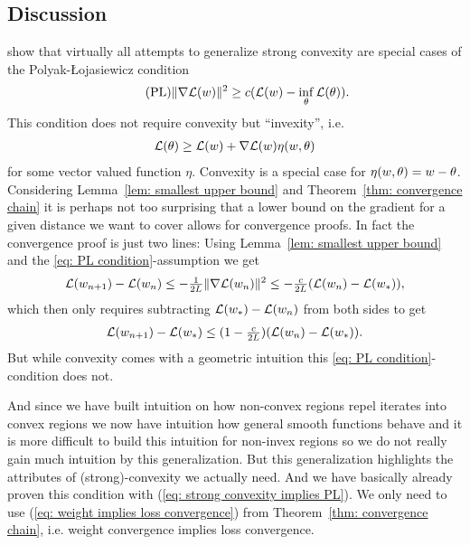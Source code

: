 \subsection{Discussion}

\textcite{karimiLinearConvergenceGradient2020} show that virtually all
attempts to generalize strong convexity are special cases of the
Polyak-\L{}ojasiewicz condition
\begin{align}
	\label{eq: PL condition}\tag{PL}
	\|\nabla \mathcal{L}(w) \|^2 \ge c(\mathcal{L}(w)-\inf_{\theta}\mathcal{L}(\theta)).
\end{align}
This condition does not require convexity but ``invexity'', i.e.
\begin{align*}
	\mathcal{L}(\theta) \ge \mathcal{L}(w) + \nabla\mathcal{L}(w)\eta(w, \theta)
\end{align*}
for some vector valued function \(\eta\). Convexity is a special case for \(\eta(w,
\theta)=w-\theta\). Considering Lemma~\ref{lem: smallest upper bound}
and Theorem~\ref{thm: convergence chain} it is perhaps not too surprising that a
lower bound on the gradient for a given distance we want to cover allows for
convergence proofs. In fact the convergence proof is just two lines:
Using Lemma~\ref{lem: smallest upper bound} and the \ref{eq: PL condition}-assumption we get
\begin{align*}
	\mathcal{L}(w_{n+1})- \mathcal{L}(w_n) \le -\tfrac1{2L} \|\nabla\mathcal{L}(w_n)\|^2
	\le -\tfrac{c}{2L}(\mathcal{L}(w_n) - \mathcal{L}(w_*)),
\end{align*}
which then only requires subtracting \(\mathcal{L}(w_*)-\mathcal{L}(w_n)\) from
both sides to get
\begin{align*}
	\mathcal{L}(w_{n+1}) - \mathcal{L}(w_*)
	\le (1-\tfrac{c}{2L})(\mathcal{L}(w_n) - \mathcal{L}(w_*)).
\end{align*}
But while convexity comes with a geometric intuition this \ref{eq: PL
condition}-condition does not.

And since we have built intuition on how non-convex regions
repel iterates into convex regions we now have intuition how general smooth
functions behave and it is more difficult to build this intuition for non-invex
regions so we do not really gain much intuition by this generalization. But
this generalization highlights the attributes of (strong)-convexity we
actually need. And we have basically already proven this condition with
(\ref{eq: strong convexity implies PL}). We only need to use (\ref{eq: weight
implies loss convergence}) from Theorem~\ref{thm: convergence chain}, i.e.
weight convergence implies loss convergence.

